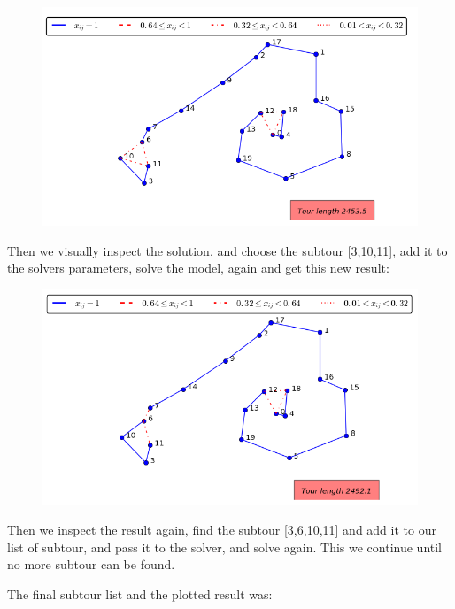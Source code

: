 \documentclass[a4paper,10pt]{article}
\begin{document}
\begin{figure}[htb]
\begin{center}
\includegraphics[scale=1.4/textwidth]{task3.1.png}
\end{center}
\end{figure}

Then we visually inspect the solution, and choose the subtour [3,10,11], add it to the solvers parameters, solve the model, again and get this new result:

\begin{figure}[htb]
\begin{center}
\includegraphics[scale=1.4/textwidth]{task3.2.png}
\end{center}
\end{figure}

Then we inspect the result again, find the subtour [3,6,10,11] and add it to our list of subtour, and pass it to the solver, and solve again. This we continue until no more subtour can be found.

The final subtour list and the plotted result was:
\end{document}
